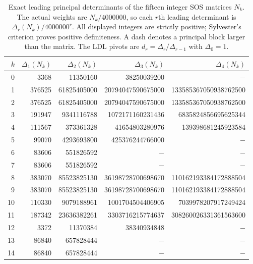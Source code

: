 \begin{table}[t]
\centering
\scriptsize
\setlength{\tabcolsep}{3pt}
\begin{tabular}{r r r r r}
\hline
$k$ & $\Delta_1(N_k)$ & $\Delta_2(N_k)$ & $\Delta_3(N_k)$ & $\Delta_4(N_k)$ \\
\hline
0 & 3368 & 11350160 & 38250039200 & $-$ \\
1 & 376525 & 61825405000 & 20794047590675000 & 133585367050938762500 \\
2 & 376525 & 61825405000 & 20794047590675000 & 133585367050938762500 \\
3 & 191947 & 9341116788 & 1072171160231436 & 6835824856695625344 \\
4 & 111567 & 373361328 & 41654803280976 & 139398681245923584 \\
5 & 99070 & 4293693800 & 425376244766000 & $-$ \\
6 & 83606 & 551826592 & $-$ & $-$ \\
7 & 83606 & 551826592 & $-$ & $-$ \\
8 & 383070 & 85523825130 & 36198728700698670 & 110162193384172888504 \\
9 & 383070 & 85523825130 & 36198728700698670 & 110162193384172888504 \\
10 & 110330 & 9079188961 & 1001704504406905 & 7039978207917249424 \\
11 & 187342 & 23636382261 & 3303716215774637 & 308260026331361563600 \\
12 & 3372 & 11370384 & 38340934848 & $-$ \\
13 & 86840 & 657828444 & $-$ & $-$ \\
14 & 86840 & 657828444 & $-$ & $-$ \\
\hline
\end{tabular}
\caption{Exact leading principal determinants of the fifteen integer SOS matrices $N_k$. The actual weights are $N_k/4000000$, so each $r$th leading determinant is $\Delta_r(N_k)/4000000^r$. All displayed integers are strictly positive; Sylvester's criterion proves positive definiteness. A dash denotes a principal block larger than the matrix. The LDL pivots are $d_r=\Delta_r/\Delta_{r-1}$ with $\Delta_0=1$.}
\label{tab:hall-sos-leading-minors}
\end{table}
